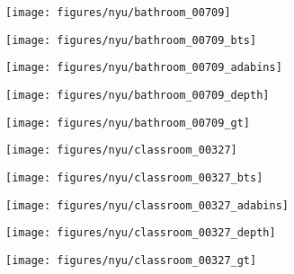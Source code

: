 \documentclass[10pt,twocolumn,letterpaper]{article}
\begin{document}
\begin{figure*}[t]
\centering
\begin{subfigure}{0.3\columnwidth}
  \centering
  \texttt{[image: figures/nyu/bathroom\_00709]}
\end{subfigure}
\begin{subfigure}{0.3\columnwidth}
  \centering
  \texttt{[image: figures/nyu/bathroom\_00709\_bts]}
\end{subfigure}
\begin{subfigure}{0.3\columnwidth}
  \centering
  \texttt{[image: figures/nyu/bathroom\_00709\_adabins]}
\end{subfigure}
\begin{subfigure}{0.3\columnwidth}
  \centering
  \texttt{[image: figures/nyu/bathroom\_00709\_depth]}
\end{subfigure}
\begin{subfigure}{0.3\columnwidth}
  \centering
  \texttt{[image: figures/nyu/bathroom\_00709\_gt]}
\end{subfigure}

\begin{subfigure}{0.3\columnwidth}
  \centering
  \texttt{[image: figures/nyu/classroom\_00327]}
\end{subfigure}
\begin{subfigure}{0.3\columnwidth}
  \centering
  \texttt{[image: figures/nyu/classroom\_00327\_bts]}
\end{subfigure}
\begin{subfigure}{0.3\columnwidth}
  \centering
  \texttt{[image: figures/nyu/classroom\_00327\_adabins]}
\end{subfigure}
\begin{subfigure}{0.3\columnwidth}
  \centering
  \texttt{[image: figures/nyu/classroom\_00327\_depth]}
\end{subfigure}
\begin{subfigure}{0.3\columnwidth}
  \centering
  \texttt{[image: figures/nyu/classroom\_00327\_gt]}
\end{subfigure}




\end{figure*}
\end{document}
